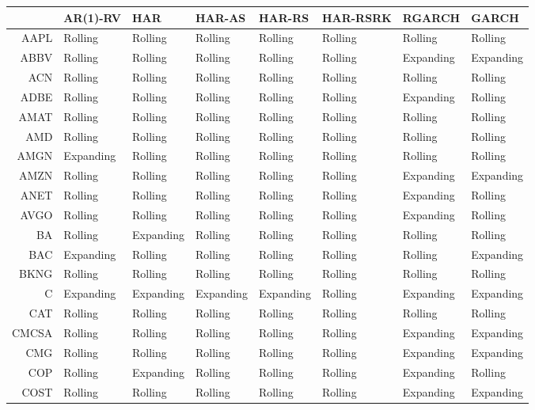 \begin{table}[ht]
\centering
\begin{tabular}{rlllllll}
  \hline
 & AR(1)-RV & HAR & HAR-AS & HAR-RS & HAR-RSRK & RGARCH & GARCH \\ 
  \hline
AAPL & Rolling & Rolling & Rolling & Rolling & Rolling & Rolling & Rolling \\ 
  ABBV & Rolling & Rolling & Rolling & Rolling & Rolling & Expanding & Expanding \\ 
  ACN & Rolling & Rolling & Rolling & Rolling & Rolling & Rolling & Rolling \\ 
  ADBE & Rolling & Rolling & Rolling & Rolling & Rolling & Expanding & Rolling \\ 
  AMAT & Rolling & Rolling & Rolling & Rolling & Rolling & Rolling & Rolling \\ 
  AMD & Rolling & Rolling & Rolling & Rolling & Rolling & Rolling & Rolling \\ 
  AMGN & Expanding & Rolling & Rolling & Rolling & Rolling & Rolling & Rolling \\ 
  AMZN & Rolling & Rolling & Rolling & Rolling & Rolling & Expanding & Expanding \\ 
  ANET & Rolling & Rolling & Rolling & Rolling & Rolling & Expanding & Rolling \\ 
  AVGO & Rolling & Rolling & Rolling & Rolling & Rolling & Expanding & Rolling \\ 
  BA & Rolling & Expanding & Rolling & Rolling & Rolling & Rolling & Rolling \\ 
  BAC & Expanding & Rolling & Rolling & Rolling & Rolling & Rolling & Expanding \\ 
  BKNG & Rolling & Rolling & Rolling & Rolling & Rolling & Rolling & Rolling \\ 
  C & Expanding & Expanding & Expanding & Expanding & Rolling & Expanding & Expanding \\ 
  CAT & Rolling & Rolling & Rolling & Rolling & Rolling & Rolling & Rolling \\ 
  CMCSA & Rolling & Rolling & Rolling & Rolling & Rolling & Expanding & Expanding \\ 
  CMG & Rolling & Rolling & Rolling & Rolling & Rolling & Expanding & Expanding \\ 
  COP & Rolling & Expanding & Rolling & Rolling & Rolling & Expanding & Rolling \\ 
  COST & Rolling & Rolling & Rolling & Rolling & Rolling & Expanding & Expanding \\ 

\end{tabular}
\end{table}
